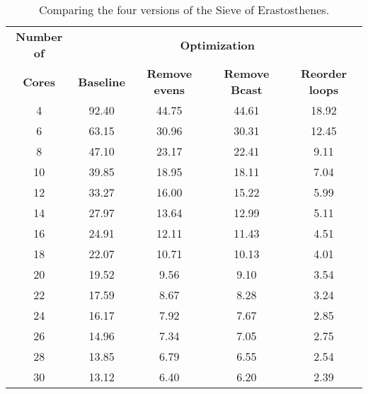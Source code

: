 \begin{table}[ht]
\centering
\begin{tabular}{ccccc}
  \toprule
  \textbf{Number of} & \multicolumn{4}{c}{\textbf{Optimization}} \\
 \textbf{Cores} & \textbf{Baseline} & \textbf{Remove evens} & \textbf{Remove Bcast} & \textbf{Reorder loops} \\
 \midrule
  4 & 92.40 & 44.75 & 44.61 & 18.92 \\ 
    6 & 63.15 & 30.96 & 30.31 & 12.45 \\ 
    8 & 47.10 & 23.17 & 22.41 & 9.11 \\ 
   10 & 39.85 & 18.95 & 18.11 & 7.04 \\ 
   12 & 33.27 & 16.00 & 15.22 & 5.99 \\ 
   14 & 27.97 & 13.64 & 12.99 & 5.11 \\ 
   16 & 24.91 & 12.11 & 11.43 & 4.51 \\ 
   18 & 22.07 & 10.71 & 10.13 & 4.01 \\ 
   20 & 19.52 & 9.56 & 9.10 & 3.54 \\ 
   22 & 17.59 & 8.67 & 8.28 & 3.24 \\ 
   24 & 16.17 & 7.92 & 7.67 & 2.85 \\ 
   26 & 14.96 & 7.34 & 7.05 & 2.75 \\ 
   28 & 13.85 & 6.79 & 6.55 & 2.54 \\ 
   30 & 13.12 & 6.40 & 6.20 & 2.39 \\ 
   \bottomrule
\end{tabular}
\caption{Comparing the four versions of the Sieve of Erastosthenes.} 
\label{tab:table1}
\end{table}
